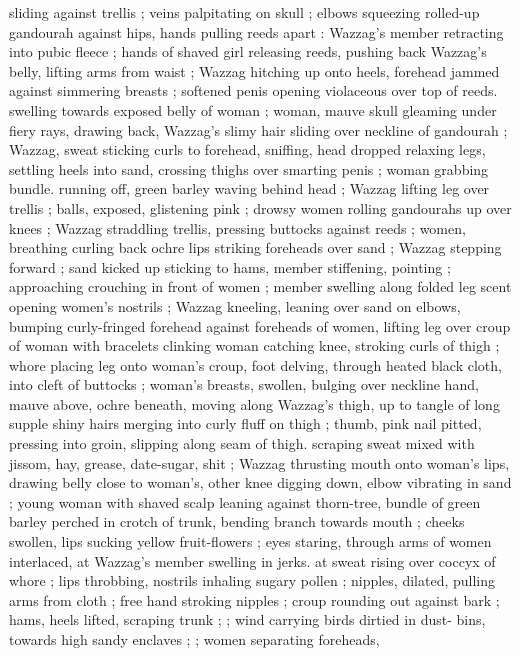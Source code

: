 sliding against trellis ; veins palpitating on skull ; elbows squeezing 
rolled-up gandourah against hips, hands pulling reeds apart : 
Wazzag's member retracting into pubic fleece ; hands of shaved girl 
releasing reeds, pushing back Wazzag's belly, lifting arms from waist 
; Wazzag hitching up onto heels, forehead jammed against simmering 
breasts ; softened penis opening violaceous over top of reeds. 
swelling towards exposed belly of woman ; woman, mauve skull 
gleaming under fiery rays, drawing back, Wazzag's slimy hair sliding 
over neckline of gandourah ; Wazzag, sweat sticking curls to 
forehead, sniffing, head dropped relaxing legs, settling heels into 
sand, crossing thighs over smarting penis ; woman grabbing bundle. 
running off, green barley waving behind head ; Wazzag lifting leg 
over trellis ; balls, exposed, glistening pink ; drowsy women rolling 
gandourahs up over knees ; Wazzag straddling trellis, pressing 
buttocks against reeds ; women, breathing curling back ochre lips 
striking foreheads over sand ; Wazzag stepping forward ; sand kicked 
up sticking to hams, member stiffening, pointing ; approaching 
crouching in front of women ; member swelling along folded leg 
scent opening women's nostrils ; Wazzag kneeling, leaning over sand 
on elbows, bumping curly-fringed forehead against foreheads of 
women, lifting leg over croup of woman with bracelets clinking 
woman catching knee, stroking curls of thigh ; whore placing leg 
onto woman's croup, foot delving, through heated black cloth, into 
cleft of buttocks ; woman's breasts, swollen, bulging over neckline 
hand, mauve above, ochre beneath, moving along Wazzag's thigh, up 
to tangle of long supple shiny hairs merging into curly fluff on thigh 
; thumb, pink nail pitted, pressing into groin, slipping along seam of 
thigh. scraping sweat mixed with jissom, hay, grease, date-sugar, shit 
; Wazzag thrusting mouth onto woman's lips, drawing belly close to 
woman's, other knee digging down, elbow vibrating in sand ; young 
woman with shaved scalp leaning against thorn-tree, bundle of green 
barley perched in crotch of trunk, bending branch towards mouth ; 
cheeks swollen, lips sucking yellow fruit-flowers ; eyes staring, 
through arms of women interlaced, at Wazzag's member swelling in 
jerks. at sweat rising over coccyx of whore ; lips throbbing, nostrils 
inhaling sugary pollen ; nipples, dilated, pulling arms from cloth ; 
free hand stroking nipples ; croup rounding out against bark ; hams, 
heels lifted, scraping trunk ; ; wind carrying birds dirtied in dust- 
bins, towards high sandy enclaves ; ; women separating foreheads, 
